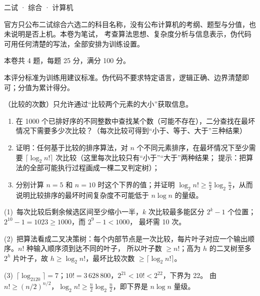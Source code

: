 \documentclass[cjk=noto, seal=first]{mojing-exam}
\begin{document}
\begin{paper}[time={建议 1.5 小时（训练设置）}, full=100]{二试 · 综合 · 计算机}

\begin{instructions}
  \item 官方只公布二试综合六选二的科目名称，没有公布计算机的考纲、题型与分值，也未说明是否上机。本卷为笔试，
        考查算法思想、复杂度分析与信息表示，伪代码可用任何清楚的写法，全部安排为训练设置。
  \item 本卷共 4 题，每题 25 分，满分 100 分。
\end{instructions}

\begin{gradingnotes}
  \item 本评分标准为训练用建议标准。伪代码不要求特定语言，逻辑正确、边界清楚即可；分值为累计得分。
\end{gradingnotes}


\begin{questions}

\question[25]
（比较的次数）只允许通过“比较两个元素的大小”获取信息。
\begin{enumerate}
  \item 在 1000 个已排好序的不同整数中查找某个数（可能不存在），二分查找在最坏情况下需要多少次比较？（每次比较可得到“小于、等于、大于”三种结果）
  \item 证明：任何基于比较的排序算法，对 $n$ 个不同元素排序，在最坏情况下至少需要 $\lceil\log_2 n!\rceil$ 次比较（这里每次比较只有“小于”“大于”两种结果；
        提示：把算法的全部可能执行过程画成一棵二叉判定树）；
  \item 分别计算 $n=5$ 和 $n=10$ 时这个下界的值；并证明 $\log_2n!\ge\frac n2\log_2\frac n2$，从而说明比较排序的最坏时间复杂度不可能低于 $n\log n$ 的量级。
\end{enumerate}
\answerspace{2cm}
\begin{solution}
(1)~每次比较后剩余候选区间至少缩小一半，$k$ 次比较最多能区分 $2^k-1$ 个位置；$2^{10}-1=1023\ge1000$，而 $2^9-1<1000$，
最坏需 10 次。

(2)~把算法看成二叉决策树：每个内部节点是一次比较，每片叶子对应一个输出顺序。$n!$ 种输入顺序须到达不同的叶子，
所以叶子数 $\ge n!$；高为 $h$ 的二叉树至多 $2^h$ 片叶子，故 $h\ge\log_2n!$，最坏比较次数 $\ge\lceil\log_2n!\rceil$。

(3)~$\lceil\log_2120\rceil=7$；$10!=3\,628\,800$，$2^{21}<10!<2^{22}$，下界为 22。
由 $n!\ge(n/2)^{n/2}$，$\log_2n!\ge\frac n2\log_2\frac n2$，即下界是 $n\log n$ 量级。
\end{solution}


\end{questions}
\end{paper}
\end{document}
